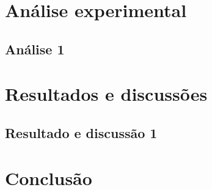\documentclass[
	12pt,				%
	oneside,			%
	a4paper,			%
	english,			%
	brazil				%
	]{abntex2}
\begin{document}
		
	

\chapter{Análise experimental}

\section{Análise 1}

\lipsum[24]


\chapter{Resultados e discussões}

\section{Resultado e discussão 1}

\lipsum[25]


\chapter{Conclusão}

\lipsum[31-33]

\postextual



%
%
\end{document}
